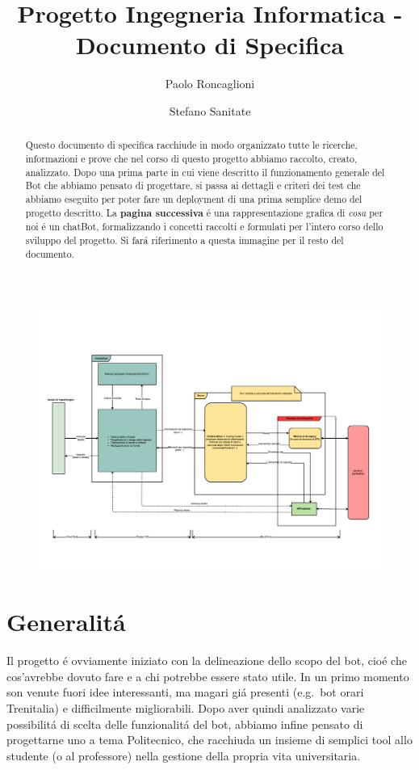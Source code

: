 \documentclass[]{article}
\begin{document}
\author{Paolo Roncaglioni \and Stefano Sanitate}
\title{Progetto Ingegneria Informatica - Documento di Specifica}
\maketitle
\newpage

\begin{abstract}
Questo documento di specifica racchiude in modo organizzato tutte le ricerche, informazioni e prove che nel corso di questo progetto abbiamo raccolto, creato, analizzato. Dopo una prima parte in cui viene descritto il funzionamento generale del Bot che abbiamo pensato di progettare, si passa ai dettagli e criteri dei test che abbiamo eseguito per poter fare un deployment di una prima semplice demo del progetto descritto. La \textbf{pagina successiva} é una rappresentazione grafica di \textit{cosa} per noi é un chatBot, formalizzando i concetti raccolti e formulati per l'intero corso dello sviluppo del progetto. Si fará riferimento a questa immagine per il resto del documento. 
\end{abstract}

\tableofcontents	%

\begin{figure}
\vspace*{-3cm} 
\centering
\includegraphics[width=2\textwidth, angle =90 ]{botofficial}
\end{figure}
\newpage

\section{Generalitá}
Il progetto é ovviamente iniziato con la delineazione dello scopo del bot, cioé che cos'avrebbe dovuto fare e a chi potrebbe essere stato utile. In un primo momento son venute fuori idee interessanti, ma magari giá presenti (e.g.\ bot orari Trenitalia) e difficilmente migliorabili.
Dopo aver quindi analizzato varie possibilitá di scelta delle funzionalitá del bot, abbiamo infine pensato di progettarne uno a tema Politecnico, che racchiuda un insieme di semplici tool allo studente (o al professore) nella gestione della propria vita universitaria. 
\end{document}
